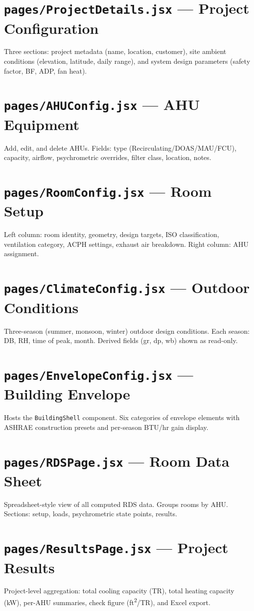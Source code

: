 \documentclass[12pt, a4paper, oneside]{report}
\newcommand{\file}[1]{\texttt{\textcolor{codeblue}{#1}}}
\newcommand{\code}[1]{\texttt{\textcolor{codered}{#1}}}
\begin{document}
\section{\file{pages/ProjectDetails.jsx} --- Project Configuration}
Three sections: project metadata (name, location, customer), site ambient conditions (elevation, latitude, daily range), and system design parameters (safety factor, BF, ADP, fan heat).

\section{\file{pages/AHUConfig.jsx} --- AHU Equipment}
Add, edit, and delete AHUs. Fields: type (Recirculating/DOAS/MAU/FCU), capacity, airflow, psychrometric overrides, filter class, location, notes.

\section{\file{pages/RoomConfig.jsx} --- Room Setup}
Left column: room identity, geometry, design targets, ISO classification, ventilation category, ACPH settings, exhaust air breakdown. Right column: AHU assignment.

\section{\file{pages/ClimateConfig.jsx} --- Outdoor Conditions}
Three-season (summer, monsoon, winter) outdoor design conditions. Each season: DB, RH, time of peak, month. Derived fields (gr, dp, wb) shown as read-only.

\section{\file{pages/EnvelopeConfig.jsx} --- Building Envelope}
Hosts the \code{BuildingShell} component. Six categories of envelope elements with ASHRAE construction presets and per-season BTU/hr gain display.

\section{\file{pages/RDSPage.jsx} --- Room Data Sheet}
Spreadsheet-style view of all computed RDS data. Groups rooms by AHU. Sections: setup, loads, psychrometric state points, results.

\section{\file{pages/ResultsPage.jsx} --- Project Results}
Project-level aggregation: total cooling capacity (TR), total heating capacity (kW), per-AHU summaries, check figure (ft\textsuperscript{2}/TR), and Excel export.
\end{document}

